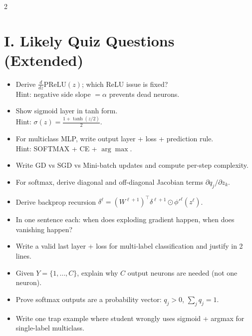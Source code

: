 \documentclass[10pt,fleqn]{article}
\begin{document}
\begin{multicols}{2}
\section*{I. Likely Quiz Questions (Extended)}
\begin{itemize}
  \item Derive \(\frac{d}{dz}\mathrm{PReLU}(z)\); which ReLU issue is fixed?\\
  Hint: negative side slope \(=\alpha\) prevents dead neurons.
  \item Show sigmoid layer in tanh form.\\
  Hint: \(\sigma(z)=\frac{1+\tanh(z/2)}{2}\).
  \item For multiclass MLP, write output layer + loss + prediction rule.\\
  Hint: SOFTMAX + CE + \(\arg\max\).
  \item Write GD vs SGD vs Mini-batch updates and compute per-step complexity.
  \item For softmax, derive diagonal and off-diagonal Jacobian terms \(\partial q_j/\partial z_k\).
  \item Derive backprop recursion \(\delta^\ell=(W^{\ell+1})^\top\delta^{\ell+1}\odot \phi'^\ell(z^\ell)\).
  \item In one sentence each: when does exploding gradient happen, when does vanishing happen?
  \item Write a valid last layer + loss for multi-label classification and justify in 2 lines.
  \item Given \(Y=\{1,\dots,C\}\), explain why \(C\) output neurons are needed (not one neuron).
  \item Prove softmax outputs are a probability vector: \(q_j>0\), \(\sum_j q_j=1\).
  \item Write one trap example where student wrongly uses sigmoid + argmax for single-label multiclass.
\end{itemize}


\end{multicols}
\end{document}
